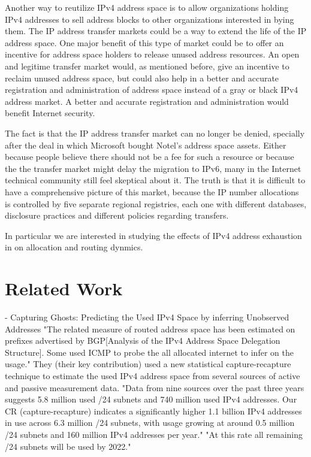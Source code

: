 \documentclass[11pt,a4paper]{scrreprt}
\begin{document}
Another way to reutilize IPv4 address space is to allow organizations holding IPv4 addresses to sell address blocks to other organizations interested in bying them. The IP address transfer markets could be a way to extend the life of the IP address space. One major benefit of this type of market could be to offer an incentive for address space holders to release unused address resources. An open and legitime transfer market would, as mentioned before, give an incentive to reclaim unused address space, but could also help in a better and accurate registration and administration of address space instead of a gray or black IPv4 address market. A better and accurate registration and administration would benefit Internet security.  

The fact is that the IP address transfer market can no longer be denied, specially after the deal in which Microsoft bought Notel's address space assets. Either because people believe there should not be a fee for such a resource or because the the transfer market might delay the migration to IPv6, many in the Internet technical community still feel skeptical about it. The truth is that it is difficult to have a comprehensive picture of this market, because the IP number allocations is controlled by five separate regional registries, each one with different databases, disclosure practices and different policies regarding transfers. 

In particular we are interested in studying the effects of IPv4 address exhaustion in on allocation and routing dynmics.

\chapter{Related Work}
- Capturing Ghosts: Predicting the Used IPv4 Space by inferring Unobserved Addresses
"The related measure of routed address space has been estimated on prefixes advertised by BGP[Analysis of the IPv4 Address Space Delegation Structure]. Some used ICMP to probe the all allocated internet to infer on the usage." They (their key contribution) used a new statistical capture-recapture technique to estimate the used IPv4 address space from several sources of active and passive measurement data. "Data from nine sources over the past three years suggests 5.8 million used /24 subnets and 740 million used IPv4 addresses. Our CR (capture-recapture) indicates a significantly higher 1.1 billion IPv4 addresses in use across 6.3 million /24 subnets, with usage growing at around 0.5 million /24 subnets and 160 million IPv4 addresses per year." "At this rate all remaining /24 subnets will be used by 2022."
\end{document}

